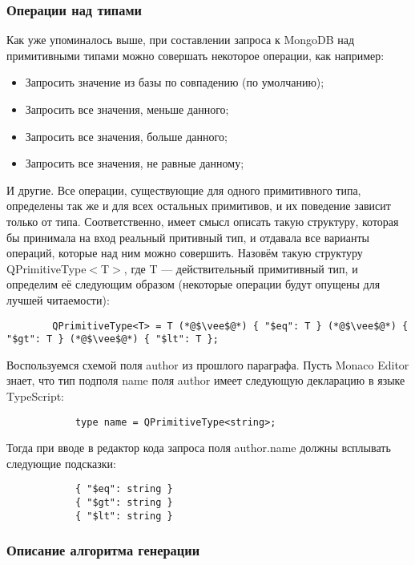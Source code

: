 \documentclass[12pt]{article}
\begin{document}
    \subsubsection{Операции над типами}

    Как уже упоминалось выше, при составлении запроса к MongoDB над примитивными типами можно совершать некоторое операции, как например:
    \begin{itemize}
        \item Запросить значение из базы по совпадению (по умолчанию);
        \item Запросить все значения, меньше данного;
        \item Запросить все значения, больше данного;
        \item Запросить все значения, не равные данному;
    \end{itemize}
    И другие. Все операции, существующие для одного примитивного типа, определены так же и для всех остальных примитивов, и их поведение зависит только
    от типа. Соответственно, имеет смысл описать такую структуру, которая бы принимала на вход реальный притивный тип, и отдавала все варианты операций,
    которые над ним можно совершить. Назовём такую структуру QPrimitiveType$<$T$>$, где T --- действительный примитивный тип,
    и определим её следующим образом (некоторые операции будут опущены для лучшей читаемости):
    \begin{lstlisting}
        QPrimitiveType<T> = T (*@$\vee$@*) { "$eq": T } (*@$\vee$@*) { "$gt": T } (*@$\vee$@*) { "$lt": T };
    \end{lstlisting}
    \begin{example}
        Воспользуемся схемой поля author из прошлого параграфа. Пусть Monaco Editor знает, что тип подполя name поля author имеет следующую декларацию
        в языке TypeScript:
        \begin{lstlisting}
            type name = QPrimitiveType<string>;
        \end{lstlisting}
        Тогда при вводе в редактор кода запроса поля author.name должны всплывать следующие подсказки:\\
        \begin{lstlisting}
            { "$eq": string }
            { "$gt": string }
            { "$lt": string }
        \end{lstlisting}
    \end{example}

    \subsubsection{Описание алгоритма генерации}
\end{document}
